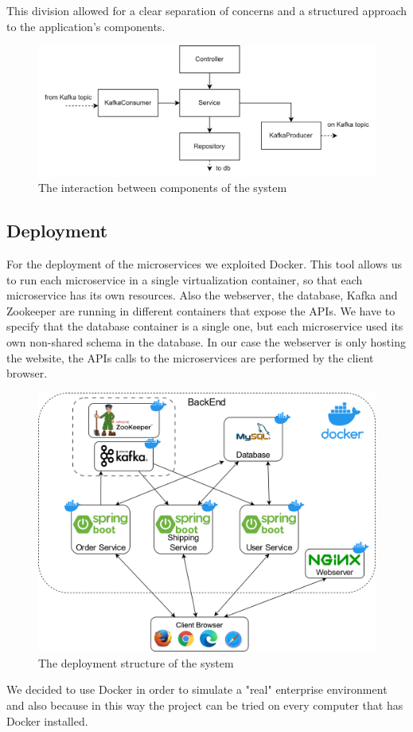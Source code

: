 \documentclass[11pt]{article}
\begin{document}
This division allowed for a clear separation of concerns and a structured approach to the application's components.

\begin{figure}[H]
    \centering
    \includegraphics[width=1\linewidth]{resources/Implementation.png} 
    \caption{The interaction between components of the system}
\end{figure}

\subsection{Deployment}

For the deployment of the microservices we exploited Docker. This tool allows us to run each microservice in a single virtualization container, so that each microservice has its own resources.
Also the webserver, the database, Kafka and Zookeeper are running in different containers that expose the APIs.
We have to specify that the database container is a single one, but each microservice used its own non-shared schema in the database. 
In our case the webserver is only hosting the website, the APIs calls to the microservices are performed by the client browser.
\begin{figure}[H]
    \centering
    \includegraphics[width=1\linewidth]{resources/Deployment.png} 
    \caption{The deployment structure of the system}
\end{figure}
We decided to use Docker in order to simulate a "real" enterprise environment and also because in this way the project can be tried on every computer that has Docker installed.
\end{document}
